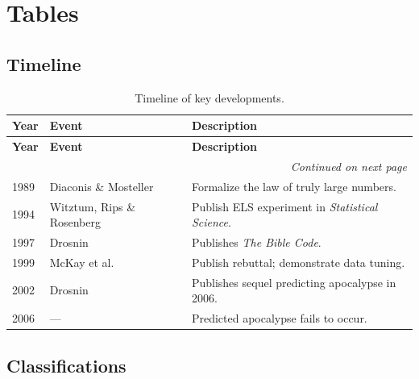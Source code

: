\documentclass[11pt]{amsart}
\theoremstyle{plain}
\theoremstyle{remark}
\begin{document}
\section{Tables}

\subsection{Timeline}

\begin{longtable}{llp{8cm}}
	\caption{Timeline of key developments.}\\
	\toprule
	\textbf{Year} & \textbf{Event} & \textbf{Description} \\
	\midrule
	\endfirsthead
	
	\toprule
	\textbf{Year} & \textbf{Event} & \textbf{Description} \\
	\midrule
	\endhead
	
	\midrule
	\multicolumn{3}{r}{\textit{Continued on next page}} \\
	\endfoot
	
	\bottomrule
	\endlastfoot
	
	1989 & Diaconis \& Mosteller & Formalize the law of truly large numbers. \\
	1994 & Witztum, Rips \& Rosenberg & Publish ELS experiment in \emph{Statistical Science}. \\
	1997 & Drosnin & Publishes \emph{The Bible Code}. \\
	1999 & McKay et al. & Publish rebuttal; demonstrate data tuning. \\
	2002 & Drosnin & Publishes sequel predicting apocalypse in 2006. \\
	2006 & --- & Predicted apocalypse fails to occur. \\
\end{longtable}

\subsection{Classifications}
\end{document}

